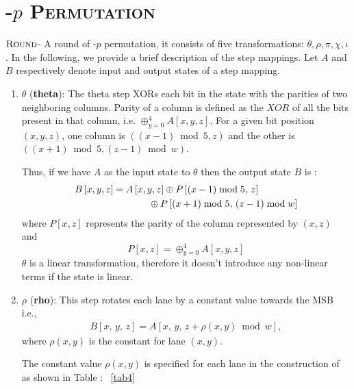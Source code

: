 \section{\textsc{\Keccak-$p$ Permutation}}
$\textsc{Round}$\;- A round of \KECCAK-$p$ permutation, it consists of five transformations: {$\theta,\rho,\pi,\chi,\iota$}. 
In the following, we provide a brief description of the step mappings.
 Let $A$ and $B$ respectively denote input and output states of a step mapping.
\begin{enumerate}
    \item $\theta$ ({\bf theta}): The theta step XORs each bit in the state with the parities of two neighboring columns. 
		Parity of a column is defined as the $XOR$ of all the bits present in that column, i.e. $\oplus_{y = 0}^{4} A[x, y, z]$. For a given bit position $(x, y, z)$, one column is $((x - 1) \bmod 5, z) $ and the other is $((x+1)\bmod 5, (z - 1) \bmod w)$.
    
    Thus, if we have $A$ as the input state to $\theta$ then the output state $B$ is :
    \begin{align}\nonumber
        B\left[x, y, z\right] &= A\left[x, y, z\right] \oplus P\left[ (x - 1) \bmod 5 ,\, z \right] \\
        &\hspace{1.3cm}\oplus P\left[ (x + 1) \bmod 5 ,\, (z - 1) \bmod w \right]
    \end{align}
    where $P[x, z]$ represents the parity of the column represented by $(x, z)$ and 
    \[
        P[x, z]  = \oplus_{y = 0}^{4} A[x, y, z]
    \]
    $\theta$ is a linear transformation, therefore it doesn't introduce any non-linear terms if the state is linear.
    \vskip5pt
    \item $\rho$ ({\bf rho}): This step rotates each lane by a constant value towards the MSB i.e., 
    \begin{align}
        B[x, \,y,\, z] = A[x, \,y, \,z + \rho(x, y) \bmod w ],
    \end{align}
    where $\rho(x, y)$ is the constant for lane $(x, y)$. 
    
		The constant value $\rho(x, y)$ is specified for each lane in the construction of \Keccak{} as shown in Table : ~\ref{tab4} 
		

\end{enumerate}
